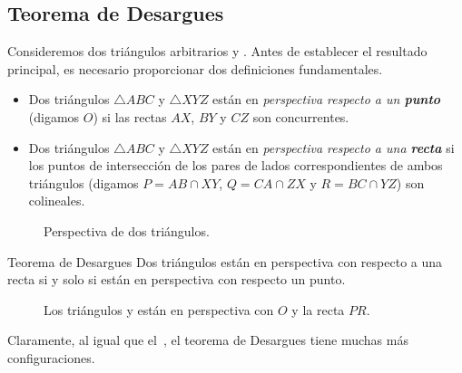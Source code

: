 \subsection{Teorema de Desargues}

Consideremos dos triángulos arbitrarios  y .
Antes de establecer el resultado principal, es necesario proporcionar dos definiciones fundamentales.

\begin{section-definition.tcb}{}{}
    \begin{itemize}
        \item Dos triángulos $\triangle ABC$ y $\triangle XYZ$ están en \textit{perspectiva respecto a un \textbf{punto}} (digamos $O$) si las rectas $AX$, $BY$ y $CZ$ son concurrentes.
        \item Dos triángulos $\triangle ABC$ y $\triangle XYZ$ están en \textit{perspectiva respecto a una \textbf{recta}} si los puntos de intersección de los pares de lados correspondientes de ambos triángulos (digamos $P = AB \cap XY$, $Q = CA \cap ZX$ y $R = BC \cap YZ$) son colineales.
    \end{itemize}
\end{section-definition.tcb}

\begin{figure}[H]
    \centering
    
    \caption{Perspectiva de dos triángulos.}
\end{figure}


\begin{section-theorem.tcb}{Teorema de Desargues}{}
    Dos triángulos están en perspectiva con respecto a una recta si y solo si están en perspectiva con respecto un punto.
\end{section-theorem.tcb}

\begin{figure}[H]
    \centering
    
    \caption{Los triángulos  y  están en perspectiva con $O$ y la recta $PR$.}
\end{figure}

Claramente, al igual que el~, el teorema de Desargues tiene muchas más configuraciones.

